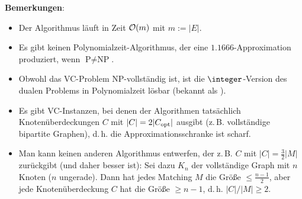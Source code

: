 \linie

\textbf{Bemerkungen}:
\begin{itemize}
    \item
    Der Algorithmus läuft in Zeit $\mathcal{O}(m)$ mit $m := |E|$.

    \item
    Es gibt keinen Polynomialzeit-Algorithmus, der eine $1.1666$-Approximation produziert,
    wenn $\text{P} \not= \text{NP}$.

    \item
    Obwohl das VC-Problem NP-vollständig ist, ist die $\integer$-Version des dualen Problems
    in Polynomialzeit lösbar (bekannt als ).

    \item
    Es gibt VC-Instanzen, bei denen der Algorithmen tatsächlich Knotenüberdeckungen $C$
    mit $|C| = 2|C_{\text{opt}}|$ ausgibt
    (z.\,B. vollständige bipartite Graphen),
    d.\,h. die Approximationsschranke ist scharf.

    \item
    Man kann keinen anderen Algorithmus entwerfen, der z.\,B. $C$ mit
    $|C| = \frac{3}{2} |M|$ zurückgibt (und daher besser ist):
    Sei dazu $K_n$ der vollständige Graph mit $n$ Knoten ($n$ ungerade).
    Dann hat jedes Matching $M$ die Größe $\le \frac{n-1}{2}$,
    aber jede Knotenüberdeckung $C$ hat die Größe $\ge n - 1$,
    d.\,h. $|C|/|M| \ge 2$.
\end{itemize}

\pagebreak
